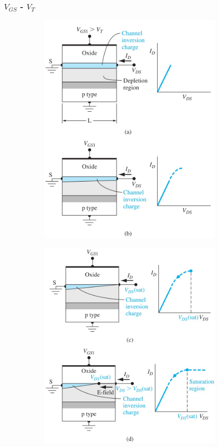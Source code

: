 \documentclass{beamer}
\begin{document}
    \begin{frame} \frametitle{$V_{GS}$ - $V_{T} $}
        \begin{figure}[H]
            \centering
            \begin{subfigure}[b]{0.45\linewidth}
                \centering
                \includegraphics[width=0.9\linewidth]{Vgs-increasing-1.jpg}
                \label{subfig:Vgs-increasing-1.jpg}
            \end{subfigure}
            \begin{subfigure}[b]{0.45\linewidth}
                \centering
                \includegraphics[width=0.9\linewidth]{Vgs-increasing-2.jpg}

\end{subfigure}
\end{figure}
\end{frame}
\end{document}
